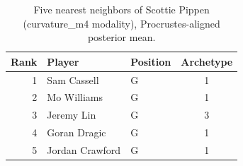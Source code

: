 \begin{table}[htbp]
  \centering\small
  \begin{tabular}{rllc}
    \toprule
    Rank & Player & Position & Archetype \\
    \midrule
    1 & Sam Cassell & G & 1 \\
    2 & Mo Williams & G & 1 \\
    3 & Jeremy Lin & G & 3 \\
    4 & Goran Dragic & G & 1 \\
    5 & Jordan Crawford & G & 1 \\
    \bottomrule
  \end{tabular}
  \caption{Five nearest neighbors of Scottie Pippen (curvature_m4 modality), Procrustes-aligned posterior mean.}
  \label{tab:Scottie_Pippen_neighbors_curvature_m4}
\end{table}

